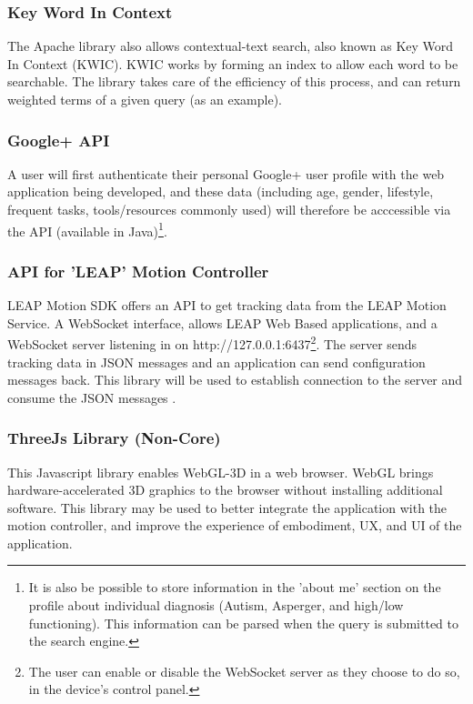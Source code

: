 \documentclass[a4paper, 10pt]{article}
\begin{document}
\subsubsection{Key Word In Context} \label{KWIC} 
The Apache library also allows contextual-text search, also known as Key Word In Context (KWIC)\cite{kwic}. KWIC works by forming an index to allow each word to be searchable. The library takes care of the efficiency of this process, and can return weighted terms of a given query (as an example).


\subsubsection{Google+ API}
A user will first authenticate their personal Google+ user profile with the web application being developed, and these data (including age, gender, lifestyle, frequent tasks, tools/resources commonly used) will therefore be acccessible via the API (available in Java)\footnote{It is also be possible to store information in the 'about me' section on the profile about individual diagnosis (Autism, Asperger, and high/low functioning). This information can be parsed when the query is submitted to the search engine.}. 

\subsubsection{API for 'LEAP' Motion Controller}
LEAP Motion SDK offers an API to get tracking data from the LEAP Motion Service. A WebSocket interface, allows LEAP Web Based applications, and a WebSocket server listening in on http://127.0.0.1:6437\footnote{The user can enable or disable the WebSocket server as they choose to do so, in the device's control panel.}.
The server sends tracking data in JSON messages and an application can send configuration messages back. This library will be used to establish connection to the server and consume the JSON messages \cite{leap}. 


\subsubsection{ThreeJs Library (Non-Core)}
This Javascript library enables WebGL-3D in a web browser. WebGL brings hardware-accelerated 3D graphics to the browser without installing additional software. This library may be used to better integrate the application with the motion controller, and improve the experience of embodiment, UX, and UI of the application.
\end{document}
